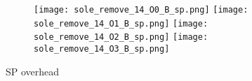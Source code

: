 \documentclass[11pt]{article}
\begin{document}
    \begin{figure}[!ht]
        \begin{subfigure}{\linewidth}
            \texttt{[image: sole\_remove\_14\_O0\_B\_sp.png]}
            \texttt{[image: sole\_remove\_14\_O1\_B\_sp.png]}
            \texttt{[image: sole\_remove\_14\_O2\_B\_sp.png]}
            \texttt{[image: sole\_remove\_14\_O3\_B\_sp.png]}
        \end{subfigure}\par\medskip
        \caption{SP overhead}\label{fig:figure8}
    \end{figure}
\end{document}
